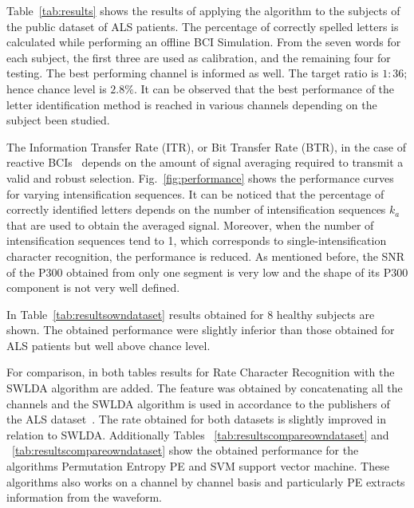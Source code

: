 \documentclass[utf8]{frontiersSCNS} %
\begin{document}
Table~\ref{tab:results} shows the results of applying the algorithm to the subjects of the public dataset of ALS patients. The percentage of correctly spelled letters is calculated while performing an offline BCI Simulation.  From the seven words for each subject, the first three are used as calibration, and the remaining four for testing.  The best performing channel is informed as well. The target ratio is $1:36$; hence chance level is $2.8\%$. It can be observed that the best performance of the letter identification method is reached in various channels depending on the subject been studied. 

The Information Transfer Rate (ITR), or Bit Transfer Rate (BTR), in the case of reactive BCIs~\citep{WolpawJonathanR2012}  depends on the amount of signal averaging required to transmit a valid and robust selection.  Fig.~\ref{fig:performance} shows the performance curves for varying intensification sequences. It can be noticed that the percentage of correctly identified letters depends on the number of intensification sequences $k_a$ that are used to obtain the averaged signal.  Moreover, when the number of intensification sequences tend to 1, which corresponds to single-intensification character recognition, the performance is reduced. As mentioned before, the SNR of the P300 obtained from only one segment is very low and the shape of its P300 component is not very well defined.

In Table~\ref{tab:resultsowndataset} results obtained for 8 healthy subjects are shown.  The obtained performance were slightly inferior than those obtained for ALS patients but well above chance level.

For comparison, in both tables results for Rate Character Recognition with the SWLDA algorithm are added.  The feature was obtained by concatenating all the channels \citep{Krusienski2006} and the SWLDA algorithm is used in accordance to the publishers of the ALS dataset~\citep{Riccio2013}.  The rate obtained for both datasets is slightly improved in relation to SWLDA.  Additionally Tables ~\ref{tab:resultscompareowndataset} and ~\ref{tab:resultscompareowndataset} show the obtained performance for the algorithms Permutation Entropy PE and SVM support vector machine.  These algorithms also works on a channel by channel basis and particularly PE extracts information from the waveform.

\end{document}
